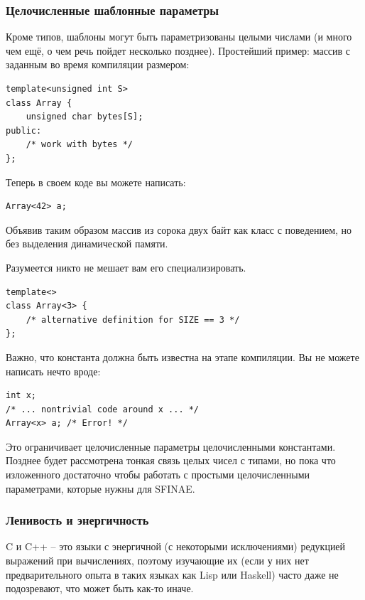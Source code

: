 \documentclass[a4paper,12pt,oneside]{article}
\begin{document}
\subsubsection{Целочисленные шаблонные параметры}\label{IntegerTParam}

Кроме типов, шаблоны могут быть параметризованы целыми числами (и много чем ещё, о чем речь пойдет несколько позднее). Простейший пример: массив с заданным во время компиляции размером:

\begin{lstlisting}
template<unsigned int S>
class Array {
    unsigned char bytes[S];
public:
    /* work with bytes */
};
\end{lstlisting}

Теперь в своем коде вы можете написать:

\begin{lstlisting}
Array<42> a;
\end{lstlisting}

Объявив таким образом массив из сорока двух байт как класс с поведением, но без выделения динамической памяти.

Разумеется никто не мешает вам его специализировать.

\begin{lstlisting}
template<>
class Array<3> {
    /* alternative definition for SIZE == 3 */
};
\end{lstlisting}

Важно, что константа должна быть известна на этапе компиляции. Вы не можете написать нечто вроде:

\begin{lstlisting}
int x;
/* ... nontrivial code around x ... */
Array<x> a; /* Error! */
\end{lstlisting}

Это ограничивает целочисленные параметры целочисленными константами. Позднее будет рассмотрена тонкая связь целых чисел с типами, но пока что изложенного достаточно чтобы работать с простыми целочисленными параметрами, которые нужны для SFINAE.

\subsubsection{Ленивость и энергичность}\label{Lazyness}

C и C++ -- это языки с энергичной (с некоторыми исключениями) редукцией выражений при вычислениях, поэтому изучающие их (если у них нет предварительного опыта в таких языках как Lisp или Haskell) часто даже не подозревают, что может быть как-то иначе.
\end{document}
